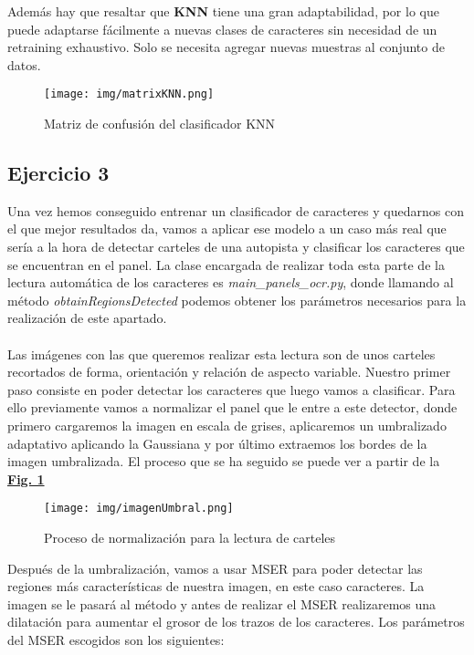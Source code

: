 \documentclass[a4paper, 12pt]{article}
\begin{document}
Además hay que resaltar que \textbf{KNN} tiene una gran adaptabilidad, por lo que puede adaptarse fácilmente a nuevas clases de caracteres sin necesidad de un retraining exhaustivo. Solo se necesita agregar nuevas muestras al conjunto de datos.

\begin{figure}[h]
	\centering
	\texttt{[image: img/matrixKNN.png]}
	\caption{Matriz de confusión del clasificador KNN}
	\label{fig:matrixknn}
\end{figure}

\subsection{Ejercicio 3}
Una vez hemos conseguido entrenar un clasificador de caracteres y quedarnos con el que mejor resultados da, vamos a aplicar ese modelo a un caso más real que sería a la hora de detectar carteles de una autopista y clasificar los caracteres que se encuentran en el panel. La clase encargada de realizar toda esta parte de la lectura automática de los caracteres es \textit{main\_panels\_ocr.py}, donde llamando al método \textit{obtainRegionsDetected} podemos obtener los parámetros necesarios para la realización de este apartado. \\\\
Las imágenes con las que queremos realizar esta lectura son de unos carteles recortados de forma, orientación y relación de aspecto variable. Nuestro primer paso consiste en poder detectar los caracteres que luego vamos a clasificar. Para ello previamente vamos a normalizar el panel que le entre a este detector, donde primero cargaremos la imagen en escala de grises, aplicaremos un umbralizado adaptativo aplicando la Gaussiana y por último extraemos los bordes de la imagen umbralizada. El proceso que se ha seguido se puede ver a partir de la \textbf{\hyperref[fig:normalizacion]{Fig. 1}}
\newpage
\begin{figure}[h]
	\centering
	\texttt{[image: img/imagenUmbral.png]}
 	\caption{Proceso de normalización para la lectura de carteles}\vspace{0.5cm}
	\label{fig:normalizacion}
\end{figure}
Después de la umbralización, vamos a usar MSER para poder detectar las regiones más características de nuestra imagen, en este caso caracteres. La imagen se le pasará al método y antes de realizar el MSER realizaremos una dilatación para aumentar el grosor de los trazos de los caracteres. Los parámetros del MSER escogidos son los siguientes:
\end{document}
